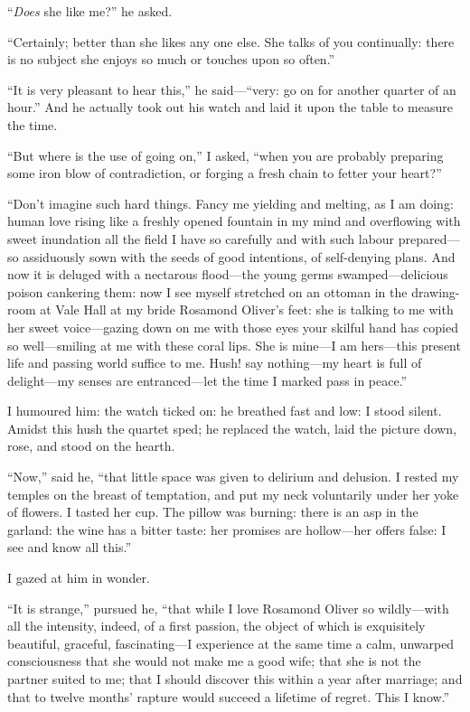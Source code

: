 \enquote{\emph{Does} she like me?} he asked.

\enquote{Certainly; better than she likes any one else. She talks of
you continually: there is no subject she enjoys so much or touches upon
so often.}

\enquote{It is very pleasant to hear this,} he said---\enquote{very: go
on for another quarter of an hour.} And he actually took out his watch
and laid it upon the table to measure the time.

\enquote{But where is the use of going on,} I asked, \enquote{when you
are probably preparing some iron blow of contradiction, or forging a
fresh chain to fetter your heart?}

\enquote{Don't imagine such hard things. Fancy me yielding and melting,
as I am doing: human love rising like a freshly opened fountain in my
mind and overflowing with sweet inundation all the field I have so
carefully and with such labour prepared---so assiduously sown with the
seeds of good intentions, of self-denying plans. And now it is deluged
with a nectarous flood---the young germs swamped---delicious poison
cankering them: now I see myself stretched on an ottoman in the
drawing-room at Vale Hall at my bride Rosamond Oliver's feet: she is
talking to me with her sweet voice---gazing down on me with those eyes
your skilful hand has copied so well---smiling at me with these coral
lips. She is mine---I am hers---this present life and passing world
suffice to me. Hush! say nothing---my heart is full of delight---my
senses are entranced---let the time I marked pass in peace.}

I humoured him: the watch ticked on: he breathed fast and low: I stood
silent. Amidst this hush the quartet sped; he replaced the watch, laid
the picture down, rose, and stood on the hearth.

\enquote{Now,} said he, \enquote{that little space was given to delirium
and delusion. I rested my temples on the breast of temptation, and put
my neck voluntarily under her yoke of flowers. I tasted her cup. The
pillow was burning: there is an asp in the garland: the wine has a
bitter taste: her promises are hollow---her offers false: I see and know
all this.}

I gazed at him in wonder.

\enquote{It is strange,} pursued he, \enquote{that while I love Rosamond
Oliver so wildly---with all the intensity, indeed, of a first passion,
the object of which is exquisitely beautiful, graceful, fascinating---I
experience at the same time a calm, unwarped consciousness that she
would not make me a good wife; that she is not the partner suited to me;
that I should discover this within a year after marriage; and that to
twelve months' rapture would succeed a lifetime of regret. This I
know.}

